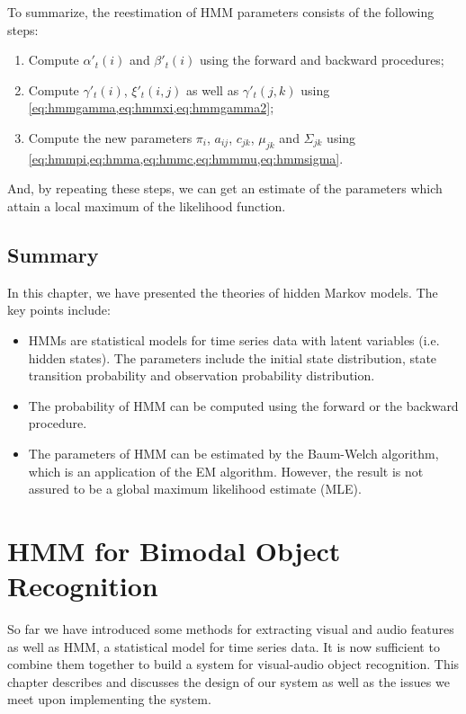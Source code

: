 \documentclass[12pt,final,twoside]{report}
\begin{document}
To summarize, the reestimation of HMM parameters consists of the following steps:
\begin{enumerate}
  \item Compute $\alpha'_t(i)$ and $\beta'_t(i)$ using the forward and backward procedures;
  \item Compute $\gamma'_t(i)$, $\xi'_t(i,j)$ as well as $\gamma'_t(j,k)$ using \cref{eq:hmmgamma,eq:hmmxi,eq:hmmgamma2};
  \item Compute the new parameters $\pi_i$, $a_{ij}$, $c_{jk}$, $\mu_{jk}$ and $\Sigma_{jk}$ using \cref{eq:hmmpi,eq:hmma,eq:hmmc,eq:hmmmu,eq:hmmsigma}.
\end{enumerate}
And, by repeating these steps, we can get an estimate of the parameters which attain a local maximum of the likelihood function.

\section{Summary}
In this chapter, we have presented the theories of hidden Markov models. The key points include:
\begin{itemize}
  \item HMMs are statistical models for time series data with latent variables (i.e. hidden states). The parameters include the initial state distribution, state transition probability and observation probability distribution.
  \item The probability of HMM can be computed using the forward or the backward procedure.
  \item The parameters of HMM can be estimated by the Baum-Welch algorithm, which is an application of the EM algorithm. However, the result is not assured to be a global maximum likelihood estimate (MLE).
\end{itemize}

\cleardoublepage
\chapter{HMM for Bimodal Object Recognition}
\label{ch:bimodal}
So far we have introduced some methods for extracting visual and audio features as well as HMM, a statistical model for time series data. It is now sufficient to combine them together to build a system for visual-audio object recognition. This chapter describes and discusses the design of our system as well as the issues we meet upon implementing the system. 
\end{document}
